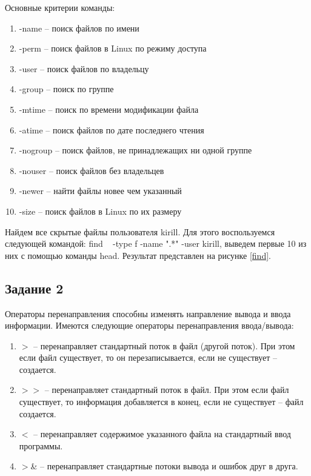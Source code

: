 Основные критерии команды:
\begin{enumerate}
    \item -name -- поиск файлов по имени
    \item -perm -- поиск файлов в Linux по режиму доступа
    \item -user -- поиск файлов по владельцу
    \item -group -- поиск по группе
    \item -mtime -- поиск по времени модификации файла
    \item -atime -- поиск файлов по дате последнего чтения
    \item -nogroup -- поиск файлов, не принадлежащих ни одной группе
    \item -nouser -- поиск файлов без владельцев
    \item -newer -- найти файлы новее чем указанный
    \item -size -- поиск файлов в Linux по их размеру
\end{enumerate}

Найдем все скрытые файлы пользователя kirill. Для этого воспользуемся следующей командой: find ~ -type f -name ".*" -user kirill, выведем первые 10 из них с помощью команды head. Результат представлен на рисунке \ref{find}.


\subsection{Задание 2}

Операторы перенаправления способны изменять направление вывода и ввода информации. Имеются следующие операторы перенаправления ввода/вывода:
\begin{enumerate}
    \item $>$ -- перенаправляет стандартный поток в файл (другой поток). При этом если файл существует, то он перезаписывается, если не существует – создается.
    \item $>>$  -- перенаправляет стандартный поток в файл. При этом если файл существует, то информация добавляется в конец, если не существует – файл создается.
    \item $<$ -- перенаправляет содержимое указанного файла на стандартный ввод программы.
    \item $>$\&  -- перенаправляет стандартные потоки вывода и ошибок друг в друга.
\end{enumerate}

